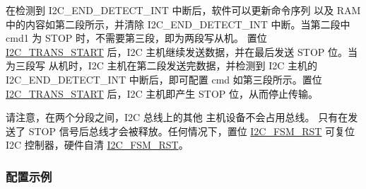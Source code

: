 \documentclass[main\_\_CN.tex]{subfiles}
\begin{document}
在检测到 I2C\_END\_DETECT\_INT 中断后，软件可以更新命令序列 以及 RAM 中的内容如第二段所示，并清除 I2C\_END\_DETECT\_INT 中断。当第二段中 cmd1 为 STOP 时，不需要第三段，即为两段写从机。 置位 \hyperref[fielddesc:I2CTRANSSTART]{I2C\_TRANS\_START} 后，I2C 主机继续发送数据，并在最后发送 STOP 位。当为三段写 从机时，I2C 主机在第二段发送完数据，并检测到 I2C 主机的 I2C\_END\_DETECT\_INT 中断后，即可配置 cmd 如第三段所示。置位 \hyperref[fielddesc:I2CTRANSSTART]{I2C\_TRANS\_START} 后，I2C 主机即产生 STOP 位，从而停止传输。

请注意，在两个分段之间，I2C 总线上的其他 主机设备不会占用总线。 只有在发送了 STOP 信号后总线才会被释放。任何情况下，置位 \hyperref[fielddesc:I2CFSMRST]{I2C\_FSM\_RST} 可复位 I2C 控制器，硬件自清 \hyperref[fielddesc:I2CFSMRST]{I2C\_FSM\_RST}。

\subsubsection{配置示例}
\end{document}
